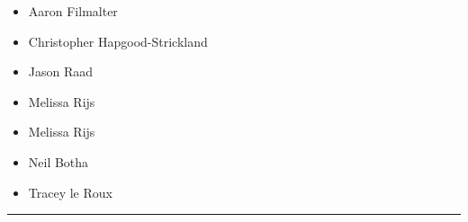 \documentclass[10pt]{article}
\begin{document}
		

	\begin{multicols}{2}

		\begin{itemize}
									\item Aaron Filmalter
									\item Christopher Hapgood-Strickland
									\item Jason Raad
									\item Melissa Rijs
						\end{itemize}

		\vfill\null
		\columnbreak

		\begin{itemize}
									\item Melissa Rijs
									\item Neil Botha
									\item Tracey le Roux
						\end{itemize}

		\vfill\null

		\end{multicols}



			\vspace{0.5cm}
	\hrule
	\vspace{0.5cm}
\end{document}
